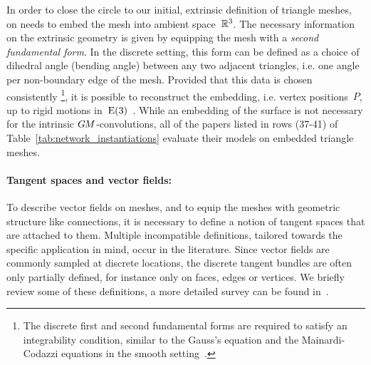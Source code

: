 In order to close the circle to our initial, extrinsic definition of triangle meshes, on needs to embed the mesh into ambient space~$\mathbb{R}^3$.
The necessary information on the extrinsic geometry is given by equipping the mesh with a \emph{second fundamental form}.
In the discrete setting, this form can be defined as a choice of dihedral angle (bending angle) between any two adjacent triangles, i.e. one angle per non-boundary edge of the mesh.
Provided that this data is chosen consistently%
\footnote{
    The discrete first and second fundamental forms are required to satisfy an integrability condition,
    similar to the Gauss's equation and the Mainardi-Codazzi equations in the smooth setting~\cite{wang2012surfaceReconstruction}.
},
it is possible to reconstruct the embedding, i.e. vertex positions~$P$, up to rigid motions in~$\operatorname{E}(3)$~\cite{lipman2005linear,wang2012surfaceReconstruction}.
While an embedding of the surface is not necessary for the intrinsic $G\mkern-1.4muM$-convolutions, all of the papers listed in rows (37-41) of Table~\ref{tab:network_instantiations} evaluate their models on embedded triangle meshes.



\paragraph{Tangent spaces and vector fields:}
To describe vector fields on meshes, and to equip the meshes with geometric structure like connections, it is necessary to define a notion of tangent spaces that are attached to them.
Multiple incompatible definitions, tailored towards the specific application in mind, occur in the literature.
Since vector fields are commonly sampled at discrete locations, the discrete tangent bundles are often only partially defined, for instance only on faces, edges or vertices.
We briefly review some of these definitions, a more detailed survey can be found in~\cite{deGoes2016VectorFieldProcessing}.


